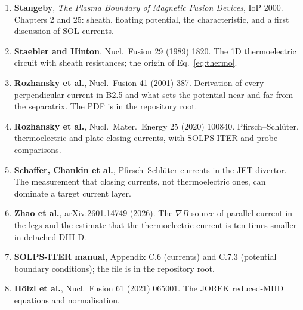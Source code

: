 \documentclass[11pt,a4paper]{article}
\begin{document}
\begin{enumerate}
\item \textbf{Stangeby}, \emph{The Plasma Boundary of Magnetic Fusion Devices}, IoP 2000. Chapters 2 and 25: sheath,
      floating potential, the characteristic, and a first discussion of SOL currents.
\item \textbf{Staebler and Hinton}, Nucl.\ Fusion 29 (1989) 1820. The 1D thermoelectric circuit with sheath
      resistances; the origin of Eq.~\eqref{eq:thermo}.
\item \textbf{Rozhansky et al.}, Nucl.\ Fusion 41 (2001) 387. Derivation of every perpendicular current in B2.5 and
      what sets the potential near and far from the separatrix. The PDF is in the repository root.
\item \textbf{Rozhansky et al.}, Nucl.\ Mater.\ Energy 25 (2020) 100840. Pfirsch--Schl\"uter, thermoelectric and plate
      closing currents, with SOLPS-ITER and probe comparisons.
\item \textbf{Schaffer, Chankin et al.}, Pfirsch--Schl\"uter currents in the JET divertor. The measurement that closing
      currents, not thermoelectric ones, can dominate a target current layer.
\item \textbf{Zhao et al.}, arXiv:2601.14749 (2026). The $\nabla B$ source of parallel current in the legs and the
      estimate that the thermoelectric current is ten times smaller in detached DIII-D.
\item \textbf{SOLPS-ITER manual}, Appendix C.6 (currents) and C.7.3 (potential boundary conditions); the file is in the
      repository root.
\item \textbf{H\"olzl et al.}, Nucl.\ Fusion 61 (2021) 065001. The JOREK reduced-MHD equations and normalisation.
\end{enumerate}
\end{document}
